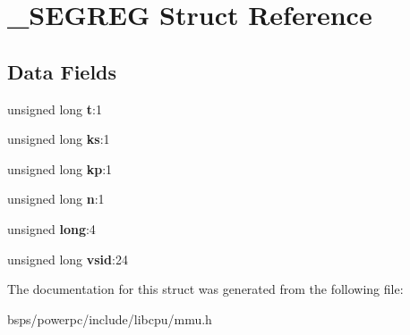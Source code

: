 \hypertarget{struct__SEGREG}{}\section{\+\_\+\+S\+E\+G\+R\+EG Struct Reference}
\label{struct__SEGREG}
\subsection*{Data Fields}
\begin{DoxyCompactItemize}
\item 
\mbox{\label{struct__SEGREG_af734ef8fb81ae34947a6b2a55e86c396}} 
unsigned long {\bfseries t}\+:1
\item 
\mbox{\label{struct__SEGREG_ad6435dc370b4b44eb928ed8c3e7fe0bd}} 
unsigned long {\bfseries ks}\+:1
\item 
\mbox{\label{struct__SEGREG_af1d5b204c96ea0f97143ddf626c26917}} 
unsigned long {\bfseries kp}\+:1
\item 
\mbox{\label{struct__SEGREG_ab42781af2c4994d3e717479d656a8ba2}} 
unsigned long {\bfseries n}\+:1
\item 
\mbox{\label{struct__SEGREG_a4ea72a324daa5d798e94101c48b8b28d}} 
unsigned {\bfseries long}\+:4
\item 
\mbox{\label{struct__SEGREG_ab047bf45a598e585d6d18627f459c4ec}} 
unsigned long {\bfseries vsid}\+:24
\end{DoxyCompactItemize}


The documentation for this struct was generated from the following file\+:\begin{DoxyCompactItemize}
\item 
bsps/powerpc/include/libcpu/mmu.\+h\end{DoxyCompactItemize}
